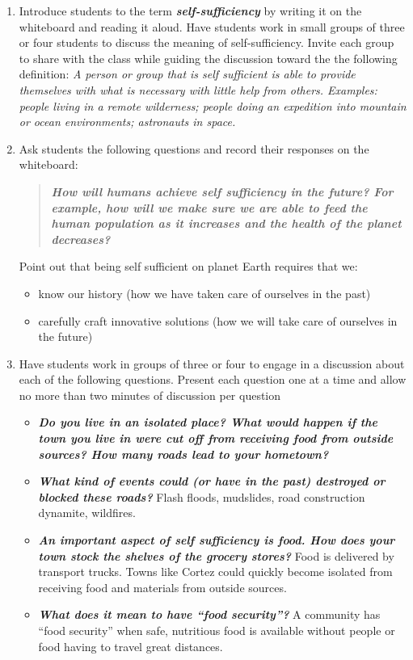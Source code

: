\documentclass[12pt,]{article}
\providecommand{\tightlist}{%
  \setlength{\itemsep}{0pt}\setlength{\parskip}{0pt}}
\begin{document}
\begin{enumerate}
\def\labelenumi{\arabic{enumi}.}
\item
  Introduce students to the term \textbf{\emph{self-sufficiency}} by writing
  it on the whiteboard and reading it aloud. Have students work in
  small groups of three or four students to discuss the meaning of
  self-sufficiency. Invite each group to share with the class while
  guiding the discussion toward the the following definition: \emph{A
  person or group that is self sufficient is able to provide
  themselves with what is necessary with little help from others.
  Examples: people living in a remote wilderness; people doing an
  expedition into mountain or ocean environments; astronauts in
  space.}
\item
  Ask students the following questions and record their responses on
  the whiteboard:

  \begin{quote}
  \textbf{\emph{How will humans achieve self sufficiency in the
  future? For example, how will we make sure we are able to feed the
  human population as it increases and the health of the planet
  decreases? }}
  \end{quote}

  Point out that being self sufficient on planet Earth
  requires that we:

  \begin{itemize}
  \tightlist
  \item
    know our history (how we have taken care of ourselves in the past)
  \item
    carefully craft innovative solutions (how we will take care of
    ourselves in the future)
  \end{itemize}
\item
  Have students work in groups of three or four to engage in a
  discussion about each of the following questions. Present each
  question one at a time and allow no more than two minutes of
  discussion per question

  \begin{itemize}
  \tightlist
  \item
    \textbf{\emph{Do you live in an isolated place? What would happen if the town
    you live in were cut off from receiving food from outside sources?
    How many roads lead to your hometown? }}
  \item
    \textbf{\emph{What kind of events could (or have in the past) destroyed or
    blocked these roads? }}
    Flash floods, mudslides, road construction dynamite, wildfires.
  \item
    \textbf{\emph{An important aspect of self sufficiency is food. How does your
    town stock the shelves of the grocery stores?}}
    Food is delivered by transport trucks. Towns like Cortez could quickly
    become isolated from receiving food and materials from outside
    sources.
  \item
    \textbf{\emph{What does it mean to have ``food security''? }}
    A community has ``food security'' when safe, nutritious food is
    available without people or food having to travel great distances.
  \end{itemize}
\end{enumerate}
\end{document}

